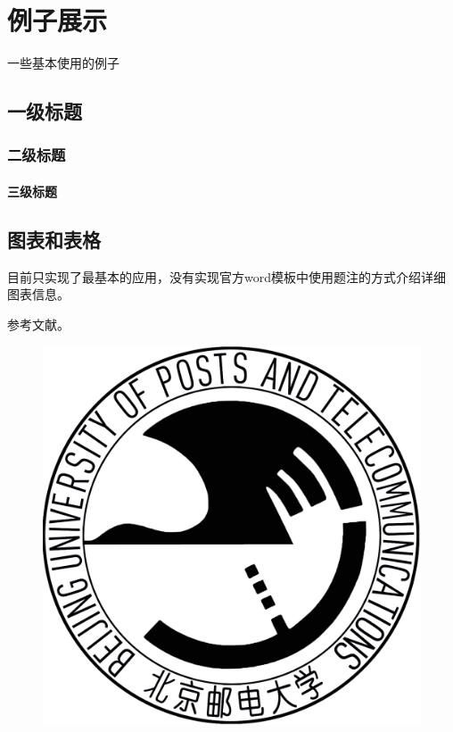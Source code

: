 \chapter{例子展示}

一些基本使用的例子


\section{一级标题}
\subsection{二级标题}
\subsubsection{三级标题}

\section{图表和表格}

目前只实现了最基本的应用，没有实现官方word模板中使用题注的方式介绍详细图表信息。

参考文献\cite{ddpg}。

\begin{figure}[htbp]
  \centering
  \includegraphics[width=\textwidth]{resources/logo.png}
  \label{fig:bupt_logo}
\end{figure}

